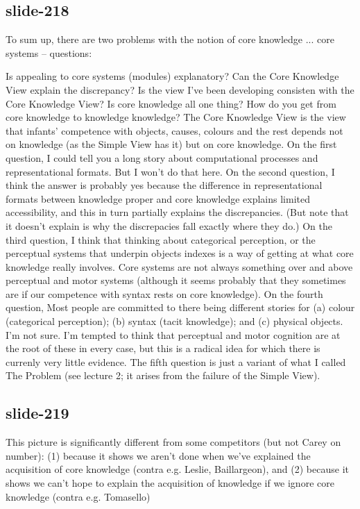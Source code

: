 \documentclass[12pt,\papersize]{extarticle}
\begin{document}
 
\subsection{slide-218}
To sum up, there are two problems with the notion of core knowledge ...
core systems -- questions:

Is appealing to core systems (modules) explanatory?
Can the Core Knowledge View explain the discrepancy?
Is the view I've been developing consisten with the Core Knowledge View?
Is core knowledge all one thing?
How do you get from core knowledge to knowledge knowledge?
The Core Knowledge View is the view that infants' competence with objects, causes, colours and the rest depends not on knowledge (as the Simple View has it) but on core knowledge.
On the first question, I could tell you a long story about computational processes and representational formats. But I won't do that here.
On the second question, I think the answer is probably yes because the difference in representational formats between knowledge proper and core knowledge explains limited accessibility, and this in turn partially explains the discrepancies. (But note that it doesn't explain is why the discrepacies fall exactly where they do.)
On the third question, I think that thinking about categorical perception, or the perceptual systems that underpin objects indexes is a way of getting at what core knowledge really involves. Core systems are not always something over and above perceptual and motor systems (although it seems probably that they sometimes are if our competence with syntax rests on core knowledge).
On the fourth question, Most people are committed to there being different stories for (a) colour (categorical perception); (b) syntax (tacit knowledge); and (c) physical objects. I'm not sure. I'm tempted to think that perceptual and motor cognition are at the root of these in every case, but this is a radical idea for which there is currenly very little evidence.
The fifth question is just a variant of what I called The Problem (see lecture 2; it arises from the failure of the Simple View).
 
 
\subsection{slide-219}
This picture is significantly different from some competitors (but not Carey on number):
(1) because it shows we aren't done when we've explained the acquisition of core knowledge (contra e.g. Leslie, Baillargeon), and
(2) because it shows we can't hope to explain the acquisition of knowledge if we ignore core knowledge (contra e.g. Tomasello)
 
\end{document}
